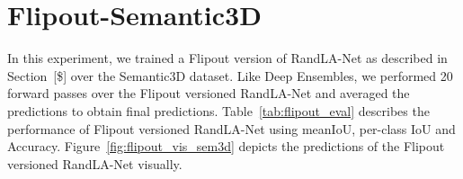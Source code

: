     \section{Flipout-Semantic3D}
    In this experiment, we trained a Flipout version of RandLA-Net as described in Section~[\$] over the Semantic3D dataset.
    Like Deep Ensembles, we performed 20 forward passes over the Flipout versioned RandLA-Net and averaged the predictions to obtain final predictions.
    Table~\ref{tab:flipout_eval} describes the performance of Flipout versioned RandLA-Net using meanIoU, per-class IoU and Accuracy.
    Figure~\ref{fig:flipout_vis_sem3d} depicts the predictions of the Flipout versioned RandLA-Net visually.
    \begin{table}[h!]
        \caption{Illustration of performance of Flipout versioned RandLA-Net on Semantic3D dataset. meanIOU, IOU per-class and overall accuracy are represented here.
        C1 to C8 are the classes of Semantic3D which are Manmadeterrain, Naturalterrain, Highvegetation, Lowvegetation, Buildings, Hardscapes, Scanningartifacts, and Cars.}
        \label{tab:flipout_eval}
    \end{table}
